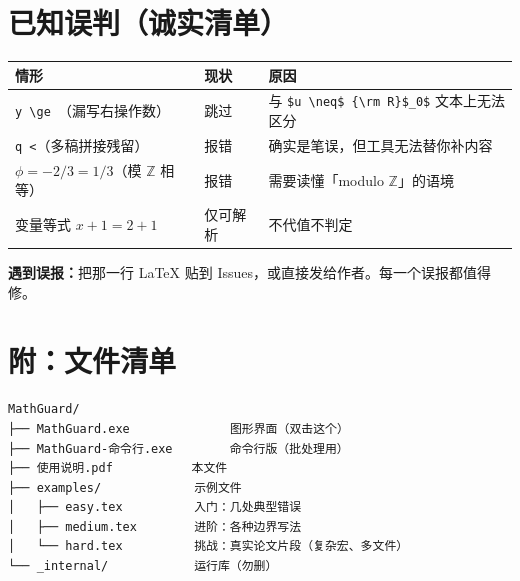 \documentclass[11pt,UTF8]{ctexart}
\begin{document}
\section{已知误判（诚实清单）}
\begin{center}
\begin{tabular}{@{}p{5.5cm}p{2.2cm}p{6.5cm}@{}}
\toprule
情形 & 现状 & 原因\\
\midrule
\verb|y \ge |（漏写右操作数） & 跳过 & 与 \verb|$u \neq$ {\rm R}$_0$| 文本上无法区分\\
\verb|q <|（多稿拼接残留） & 报错 & 确实是笔误，但工具无法替你补内容\\
$\phi=-2/3=1/3$（模 $\mathbb{Z}$ 相等） & 报错 & 需要读懂「modulo $\mathbb{Z}$」的语境\\
变量等式 $x+1=2+1$ & 仅可解析 & 不代值不判定\\
\bottomrule
\end{tabular}
\end{center}

\textbf{遇到误报：}把那一行 LaTeX 贴到 Issues，或直接发给作者。每一个误报都值得修。

\section*{附：文件清单}
\begin{verbatim}
MathGuard/
├── MathGuard.exe              图形界面（双击这个）
├── MathGuard-命令行.exe        命令行版（批处理用）
├── 使用说明.pdf           本文件
├── examples/             示例文件
│   ├── easy.tex          入门：几处典型错误
│   ├── medium.tex        进阶：各种边界写法
│   └── hard.tex          挑战：真实论文片段（复杂宏、多文件）
└── _internal/            运行库（勿删）
\end{verbatim}
\end{document}
